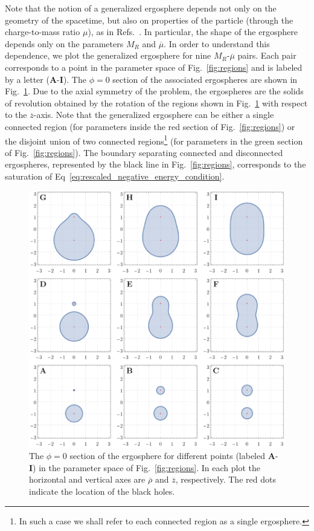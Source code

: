 Note that the notion of a generalized ergosphere depends not only on the geometry of the spacetime, but also on properties of the particle (through the charge-to-mass ratio $\mu$), as in Refs.~\cite{RUFFINI1971,DENARDO1973}. In particular, the shape of the ergosphere depends only on the parameters $M_R$ and $\overline \mu$. In order to understand this dependence, we plot the generalized ergosphere for nine $M_R$-$\overline \mu$ pairs. Each pair corresponds to a point in the parameter space of Fig.~\ref{fig:regions} and is labeled by a letter (\textbf{A}-\textbf{I}). The $\phi=0$ section of the associated ergospheres are shown in Fig.~\ref{fig:ergos}. Due to the axial symmetry of the problem, the ergospheres are the solids of revolution obtained by the rotation of the regions shown in Fig.~\ref{fig:ergos} with respect to the $\overline z$-axis. Note that the generalized ergosphere can be either a single connected region (for parameters inside the red section of Fig.~\ref{fig:regions}) or the disjoint union of two connected regions\footnote{In such a case we shall refer to each connected region as a single ergosphere.} (for parameters in the green section of Fig.~\ref{fig:regions}). The boundary separating connected and disconnected ergospheres, represented by the black line in Fig.~\ref{fig:regions}, corresponds to the saturation of Eq~\eqref{eq:rescaled_negative_energy_condition}.

\begin{figure}[!ht]
  \centering
  \includegraphics[width=\linewidth]{img/penrose_binaries/fig2.pdf}
  \caption{The $\phi=0$ section of the ergosphere for different points (labeled \textbf{A}-\textbf{I}) in the parameter space of Fig.~\ref{fig:regions}. In each plot the horizontal and vertical axes are $\overline \rho$ and $\overline z$, respectively. The red dots indicate the location of the black holes.}
  \label{fig:ergos}
\end{figure}

